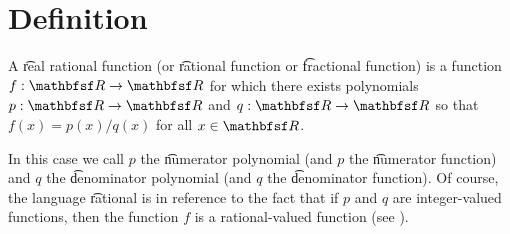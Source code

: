 

\section*{Definition}

A \t{real rational function} (or \t{rational function} or \t{fractional function}) is a function $f: \R  \to \R $ for which there exists polynomials $p: \R  \to \R $ and $q: \R  \to \R $ so that $f(x) = p(x) / q(x)$ for all $x \in \R $.

In this case we call $p$ the \t{numerator polynomial} (and $p$ the \t{numerator function}) and $q$ the \t{denominator polynomial} (and $q$ the \t{denominator function}).
Of course, the language \t{rational} is in reference to the fact that if $p$ and $q$ are integer-valued functions, then the function $f$ is a rational-valued function (see ).

\blankpage